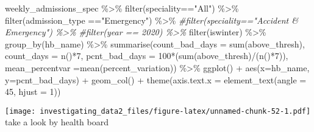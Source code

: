 \documentclass[
]{article}
\newenvironment{Shaded}{\begin{snugshade}}{\end{snugshade}}
\newcommand{\AttributeTok}[1]{\textcolor[rgb]{0.77,0.63,0.00}{#1}}
\newcommand{\CommentTok}[1]{\textcolor[rgb]{0.56,0.35,0.01}{\textit{#1}}}
\newcommand{\DecValTok}[1]{\textcolor[rgb]{0.00,0.00,0.81}{#1}}
\newcommand{\FunctionTok}[1]{\textcolor[rgb]{0.00,0.00,0.00}{#1}}
\newcommand{\NormalTok}[1]{#1}
\newcommand{\SpecialCharTok}[1]{\textcolor[rgb]{0.00,0.00,0.00}{#1}}
\newcommand{\StringTok}[1]{\textcolor[rgb]{0.31,0.60,0.02}{#1}}
\begin{document}
\begin{Shaded}
\begin{Highlighting}[]
\NormalTok{weekly\_admissions\_spec }\SpecialCharTok{\%\textgreater{}\%} 
  \FunctionTok{filter}\NormalTok{(speciality}\SpecialCharTok{==}\StringTok{"All"}\NormalTok{) }\SpecialCharTok{\%\textgreater{}\%} 
  \FunctionTok{filter}\NormalTok{(admission\_type }\SpecialCharTok{==}\StringTok{"Emergency"}\NormalTok{) }\SpecialCharTok{\%\textgreater{}\%} 
  \CommentTok{\#filter(speciality=="Accident \& Emergency") \%\textgreater{}\% }
  \CommentTok{\#filter(year == 2020) \%\textgreater{}\% }
  \FunctionTok{filter}\NormalTok{(iswinter) }\SpecialCharTok{\%\textgreater{}\%}
  \FunctionTok{group\_by}\NormalTok{(hb\_name) }\SpecialCharTok{\%\textgreater{}\%} 
  \FunctionTok{summarise}\NormalTok{(}\AttributeTok{count\_bad\_days =} \FunctionTok{sum}\NormalTok{(above\_thresh), }
            \AttributeTok{count\_days =} \FunctionTok{n}\NormalTok{()}\SpecialCharTok{*}\DecValTok{7}\NormalTok{, }
            \AttributeTok{pcnt\_bad\_days =} \DecValTok{100}\SpecialCharTok{*}\NormalTok{(}\FunctionTok{sum}\NormalTok{(above\_thresh)}\SpecialCharTok{/}\NormalTok{(}\FunctionTok{n}\NormalTok{()}\SpecialCharTok{*}\DecValTok{7}\NormalTok{)), }
            \AttributeTok{mean\_percentvar =}\FunctionTok{mean}\NormalTok{(percent\_variation)) }\SpecialCharTok{\%\textgreater{}\%}
  \FunctionTok{ggplot}\NormalTok{() }\SpecialCharTok{+}
  \FunctionTok{aes}\NormalTok{(}\AttributeTok{x=}\NormalTok{hb\_name, }\AttributeTok{y=}\NormalTok{pcnt\_bad\_days) }\SpecialCharTok{+}
  \FunctionTok{geom\_col}\NormalTok{() }\SpecialCharTok{+}
  \FunctionTok{theme}\NormalTok{(}\AttributeTok{axis.text.x =} \FunctionTok{element\_text}\NormalTok{(}\AttributeTok{angle =} \DecValTok{45}\NormalTok{, }\AttributeTok{hjust =} \DecValTok{1}\NormalTok{))}
\end{Highlighting}
\end{Shaded}

\texttt{[image: investigating\_data2\_files/figure-latex/unnamed-chunk-52-1.pdf]}
take a look by health board
\end{document}

